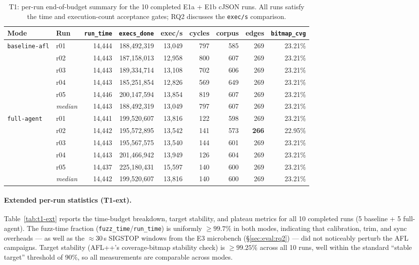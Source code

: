 \documentclass[11pt]{article}
\begin{document}
\begin{table}[t]
  \centering
  \footnotesize
  \setlength{\tabcolsep}{4.5pt}
  \begin{tabular}{@{}llrrrrrrr@{}}
    \toprule
    Mode & Run & \texttt{run\_time} & \texttt{execs\_done} & exec/s & cycles & corpus & edges & \texttt{bitmap\_cvg} \\
    \midrule
    \multirow{6}{*}{\texttt{baseline-afl}}
       & r01 & 14{,}444 & 188{,}492{,}319 & 13{,}049 & 797 & 585 & 269 & 23.21\% \\
       & r02 & 14{,}443 & 187{,}158{,}013 & 12{,}958 & 800 & 607 & 269 & 23.21\% \\
       & r03 & 14{,}443 & 189{,}334{,}714 & 13{,}108 & 702 & 606 & 269 & 23.21\% \\
       & r04 & 14{,}443 & 185{,}251{,}854 & 12{,}826 & 569 & 649 & 269 & 23.21\% \\
       & r05 & 14{,}446 & 200{,}147{,}594 & 13{,}854 & 819 & 607 & 269 & 23.21\% \\
       & \emph{median} & 14{,}443 & 188{,}492{,}319 & 13{,}049 & 797 & 607 & 269 & 23.21\% \\
    \midrule
    \multirow{6}{*}{\texttt{full-agent}}
       & r01 & 14{,}441 & 199{,}520{,}607 & 13{,}816 & 122 & 598 & 269 & 23.21\% \\
       & r02 & 14{,}442 & 195{,}572{,}895 & 13{,}542 & 141 & 573 & \textbf{266} & 22.95\% \\
       & r03 & 14{,}443 & 195{,}567{,}575 & 13{,}540 & 144 & 601 & 269 & 23.21\% \\
       & r04 & 14{,}443 & 201{,}466{,}942 & 13{,}949 & 126 & 604 & 269 & 23.21\% \\
       & r05 & 14{,}437 & 225{,}180{,}431 & 15{,}597 & 140 & 600 & 269 & 23.21\% \\
       & \emph{median} & 14{,}442 & 199{,}520{,}607 & 13{,}816 & 140 & 600 & 269 & 23.21\% \\
    \bottomrule
  \end{tabular}
  \caption{T1: per-run end-of-budget summary for the 10 completed
  E1a + E1b cJSON runs. All runs satisfy the time and execution-count
  acceptance gates; RQ2 discusses the \texttt{exec/s} comparison.}
  \label{tab:t1}
\end{table}

\paragraph{Extended per-run statistics (T1-ext).}
Table~\ref{tab:t1-ext} reports the time-budget breakdown, target
stability, and plateau metrics for all 10 completed runs (5
baseline + 5 full-agent). The fuzz-time fraction
(\texttt{fuzz\_time}/\texttt{run\_time}) is uniformly $\geq 99.7\%$
in both modes, indicating that calibration, trim, and sync
overheads --- as well as the $\approx 30$\,s SIGSTOP windows from
the E3 microbench (\S\ref{sec:eval:rq2}) --- did not
noticeably perturb the AFL campaigns. Target stability (AFL++'s
coverage-bitmap stability check) is $\geq 99.25\%$ across all 10
runs, well within the standard ``stable target'' threshold of
90\%, so all measurements are comparable across modes.
\end{document}
